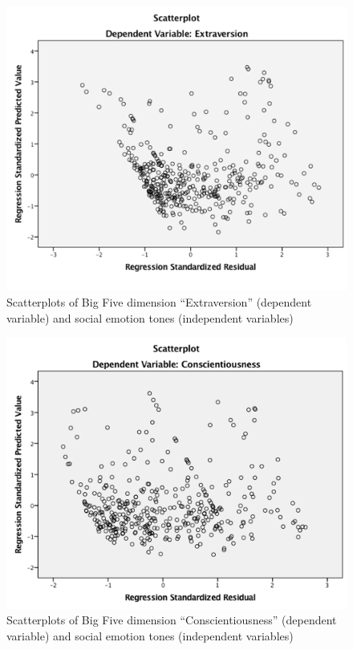 \documentclass[graybox]{svmult}
\begin{document}
{\begin{figure}[H]
\centering
\includegraphics[width=0.8\columnwidth]{images/extraversionplot.png}
\caption{Scatterplots of Big Five dimension ``Extraversion'' (dependent variable) and
  social emotion tones (independent variables)}
\label{fig:extraversionplot}
\end{figure}

\begin{figure}[H]
\centering
\includegraphics[width=0.8\columnwidth]{images/conscientiousnessplot.png}
\caption{Scatterplots of Big Five dimension ``Conscientiousness'' (dependent variable) and
  social emotion tones (independent variables)}
\label{fig:conscientiousnessplot} 
\end{figure}

}
\end{document}

